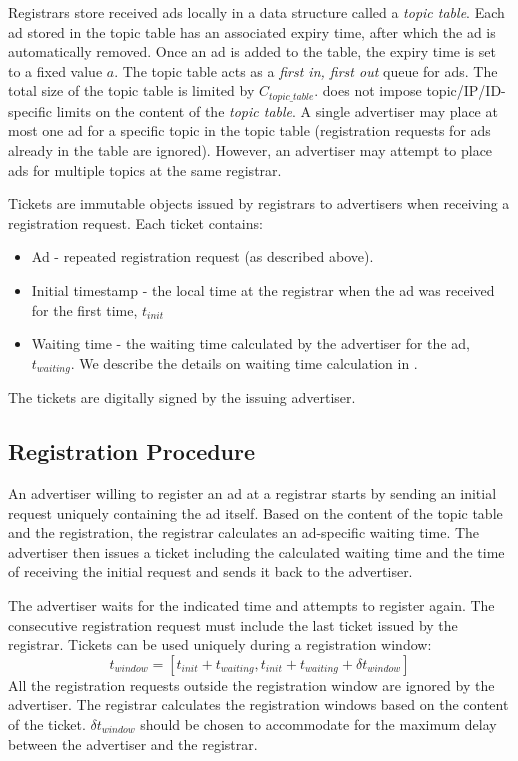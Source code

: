 Registrars store received ads locally in a data structure called a \emph{topic table}. Each ad stored in the topic table has an associated expiry time, after which the ad is automatically removed. Once an ad is added to the table, the expiry time is set to a fixed value $a$. The topic table acts as a \emph{first in, first out} queue for ads. The total size of the topic table is limited by $C_\textit{topic\_table}$. \sysname does not impose topic/IP/ID-specific limits on the content of the \emph{topic table}. 
A single advertiser may place at most one ad for a specific topic in the topic
table (registration requests for ads already in the table are ignored).
However, an advertiser may attempt to place ads for multiple topics at the same registrar.

Tickets are immutable objects issued by registrars to advertisers when receiving a registration request. Each ticket contains:
\begin{itemize}
    \item Ad - repeated registration request (as described above). 
    \item Initial timestamp - the local time at the registrar when the ad was received for the first time, $t_\textit{init}$
    \item Waiting time - the waiting time calculated by the advertiser for the ad, $t_\textit{waiting}$. We describe the details on waiting time calculation in . 
\end{itemize}
The tickets are digitally signed by the issuing advertiser. 

\subsection{Registration Procedure}
An advertiser willing to register an ad at a registrar starts by sending an
initial request uniquely containing the ad itself. Based on the
content of the topic table and the registration, the registrar calculates an
ad-specific waiting time. The advertiser then issues a ticket including the
calculated waiting time and the time of receiving the initial request and sends it back to the advertiser.

The advertiser waits for the indicated time and attempts to register again. The consecutive registration request must include the last ticket issued by the registrar. Tickets can be used uniquely during a registration window:
\begin{equation}\label{eq:registration_window}
    t_\textit{window} = [t_\textit{init} + t_\textit{waiting}, t_\textit{init} + t_\textit{waiting} + \delta t_\textit{window}]
\end{equation}
All the registration requests outside the registration window are ignored by the advertiser. The registrar calculates the registration windows based on the content of the ticket. $\delta t_\textit{window}$ should be chosen to accommodate for the maximum delay between the advertiser and the registrar. 

